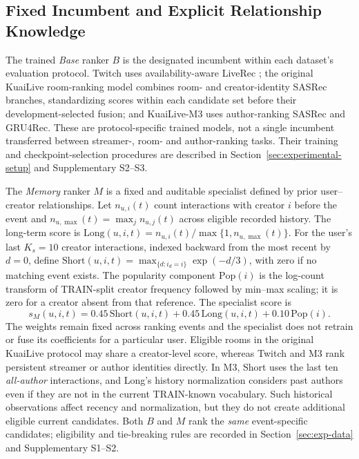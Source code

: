 \subsection{Fixed Incumbent and Explicit Relationship Knowledge}
\label{sec:framework-base}
\label{sec:framework-memory}

The trained \emph{Base} ranker $B$ is the designated incumbent within each dataset's evaluation protocol. Twitch uses availability-aware LiveRec \cite{rappaz2021liverec}; the original KuaiLive room-ranking model combines room- and creator-identity SASRec branches, standardizing scores within each candidate set before their development-selected fusion; and KuaiLive-M3 uses author-ranking SASRec and GRU4Rec. These are protocol-specific trained models, not a single incumbent transferred between streamer-, room- and author-ranking tasks. Their training and checkpoint-selection procedures are described in Section~\ref{sec:experimental-setup} and Supplementary S2--S3.

The \emph{Memory} ranker $M$ is a fixed and auditable specialist defined by prior user--creator relationships. Let $n_{u,i}(t)$ count interactions with creator $i$ before the event and $n_{u,\max}(t)=\max_j n_{u,j}(t)$ across eligible recorded history. The long-term score is $\mathrm{Long}(u,i,t)=n_{u,i}(t)/\max\{1,n_{u,\max}(t)\}$. For the user's last $K_s=10$ creator interactions, indexed backward from the most recent by $d=0$, define $\mathrm{Short}(u,i,t)=\max_{\{d:i_d=i\}}\exp(-d/3)$, with zero if no matching event exists. The popularity component $\mathrm{Pop}(i)$ is the log-count transform of TRAIN-split creator frequency followed by min--max scaling; it is zero for a creator absent from that reference. The specialist score is
\begin{equation}
s_M(u,i,t)=
0.45\,\mathrm{Short}(u,i,t)
+0.45\,\mathrm{Long}(u,i,t)
+0.10\,\mathrm{Pop}(i).
\label{eq:memory-scoring}
\end{equation}
The weights remain fixed across ranking events and the specialist does not retrain or fuse its coefficients for a particular user. Eligible rooms in the original KuaiLive protocol may share a creator-level score, whereas Twitch and M3 rank persistent streamer or author identities directly. In M3, Short uses the last ten \emph{all-author} interactions, and Long's history normalization considers past authors even if they are not in the current TRAIN-known vocabulary. Such historical observations affect recency and normalization, but they do not create additional eligible current candidates. Both $B$ and $M$ rank the \emph{same} event-specific candidates; eligibility and tie-breaking rules are recorded in Section~\ref{sec:exp-data} and Supplementary S1--S2.

